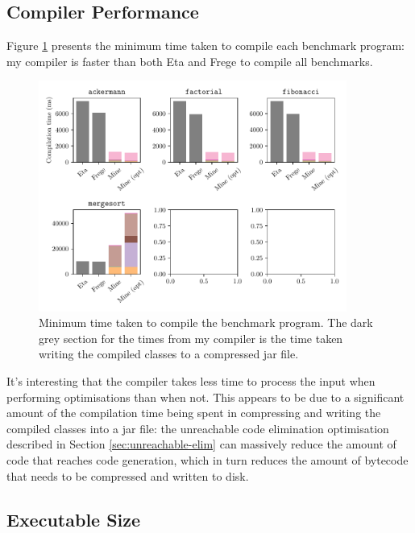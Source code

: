\documentclass[dissertation.tex]{subfiles}
\begin{document}
{    \subsection{Compiler Performance}
    {
        Figure \ref{fig:compiler-perf} presents the minimum time taken to compile each benchmark program: my compiler is faster than both Eta and Frege to compile all benchmarks.
        
        \begin{figure}[h]
            \centering
            \captionsetup{width=0.8\textwidth}
            \includegraphics[width=0.9\textwidth]{graphs/compiler_perf.pdf}
            \caption{Minimum time taken to compile the benchmark program. The dark grey section for the times from my compiler is the time taken writing the compiled classes to a compressed jar file.}
            \label{fig:compiler-perf}
        \end{figure}
        
        It's interesting that the compiler takes less time to process the input when performing optimisations than when not. This appears to be due to a significant amount of the compilation time being spent in compressing and writing the compiled classes into a jar file: the unreachable code elimination optimisation described in Section \ref{sec:unreachable-elim} can massively reduce the amount of code that reaches code generation, which in turn reduces the amount of bytecode that needs to be compressed and written to disk.
    }
    \subsection{Executable Size}
    {

}}
\end{document}
